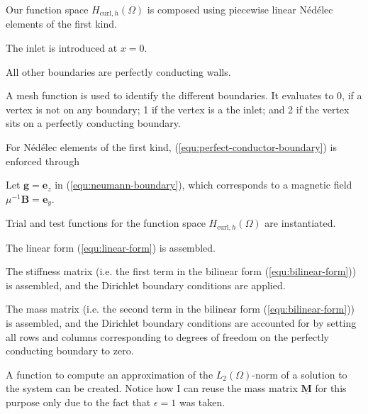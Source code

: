 \documentclass[11pt, a4paper]{article}
\begin{document}
Our function space $H_{\textrm{curl},h}(\Omega)$ is composed using piecewise
linear Nédélec elements of the first kind.


The inlet is introduced at $x = 0$.


All other boundaries are perfectly conducting walls.


A mesh function is used to identify the different boundaries. It evaluates to
0, if a vertex is not on any boundary; 1 if the vertex is a the inlet; and 2 if
the vertex sits on a perfectly conducting boundary.


For Nédélec elements of the first kind, (\ref{equ:perfect-conductor-boundary})
is enforced through


Let $\mathbf{g} = \mathbf{e}_z$ in (\ref{equ:neumann-boundary}), which corresponds
to a magnetic field $\mu^{-1} \mathbf{B} = \mathbf{e}_y$.


Trial and test functions for the function space $H_{\mathrm{curl},h}(\Omega)$ are instantiated.


The linear form (\ref{equ:linear-form}) is assembled.


The stiffness matrix (i.e. the first term in the bilinear form (\ref{equ:bilinear-form}))
is assembled, and the Dirichlet boundary conditions are applied.


The mass matrix (i.e. the second term in the bilinear form (\ref{equ:bilinear-form}))
is assembled, and the Dirichlet boundary conditions are accounted for by setting
all rows and columns corresponding to degrees of freedom on the perfectly conducting
boundary to zero.


A function to compute an approximation of the $L_2(\Omega)$-norm of a solution
to the system can be created. Notice how I can reuse the mass matrix
$\mathbf{\underline{M}}$ for this purpose only due to the fact that
$\epsilon = 1$ was taken.

\end{document}
